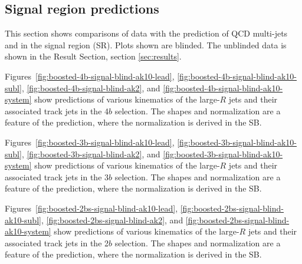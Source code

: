 \clearpage




\subsection{Signal region predictions}
\label{sec:boosted-SR}This section shows comparisons of data with the prediction of QCD multi-jets and \ttbar in the signal region (SR). Plots shown are blinded. The unblinded data is shown in the Result Section, section \ref{sec:results}.

Figures~\ref{fig:boosted-4b-signal-blind-ak10-lead}, \ref{fig:boosted-4b-signal-blind-ak10-subl}, \ref{fig:boosted-4b-signal-blind-ak2}, and \ref{fig:boosted-4b-signal-blind-ak10-system} show predictions of various kinematics of the large-$R$ jets and their associated track jets in the 4$b$ selection. The shapes and normalization are a feature of the prediction, where the normalization is derived in the SB. %

Figures~\ref{fig:boosted-3b-signal-blind-ak10-lead}, \ref{fig:boosted-3b-signal-blind-ak10-subl}, \ref{fig:boosted-3b-signal-blind-ak2}, and \ref{fig:boosted-3b-signal-blind-ak10-system} show predictions of various kinematics of the large-$R$ jets and their associated track jets in the 3$b$ selection. The shapes and normalization are a feature of the prediction, where the normalization is derived in the SB. %

Figures~\ref{fig:boosted-2bs-signal-blind-ak10-lead}, \ref{fig:boosted-2bs-signal-blind-ak10-subl}, \ref{fig:boosted-2bs-signal-blind-ak2}, and \ref{fig:boosted-2bs-signal-blind-ak10-system} show predictions of various kinematics of the large-$R$ jets and their associated track jets in the 2$b$ selection. The shapes and normalization are a feature of the prediction, where the normalization is derived in the SB. %

